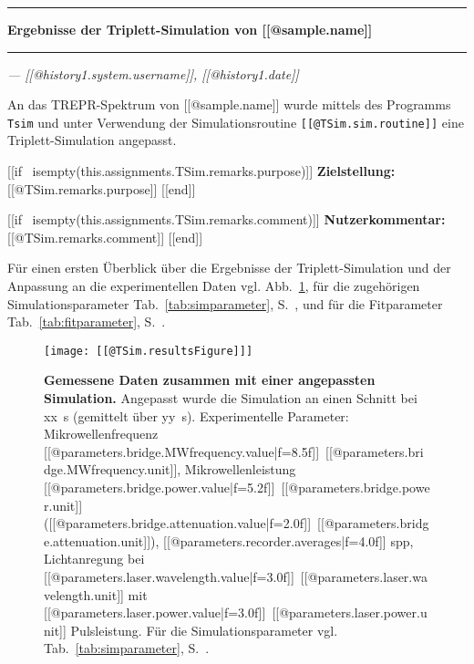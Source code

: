 \documentclass{article}
\begin{document}
\thispagestyle{empty}

\vspace*{-1.5cm}

\noindent\rule[1.5ex]{\textwidth}{1pt}

\begin{sffamily}\bfseries\large
Ergebnisse der Triplett-Simulation von [[@sample.name]]
\end{sffamily}

\noindent\rule{\textwidth}{1pt}

\begin{flushright}\slshape
--- [[@history{1}.system.username]], [[@history{1}.date]]
\end{flushright}

\vspace*{1.5em}

An das TREPR-Spektrum von [[@sample.name]] wurde mittels des Programms \texttt{Tsim} und unter Verwendung der Simulationsroutine \texttt{[[@TSim.sim.routine]]} eine Triplett-Simulation angepasst.

[[if ~isempty(this.assignments.TSim.remarks.purpose)]]
\textbf{Zielstellung:} [[@TSim.remarks.purpose]]
[[end]]

[[if ~isempty(this.assignments.TSim.remarks.comment)]]
\textbf{Nutzerkommentar:} [[@TSim.remarks.comment]]
[[end]]

Für einen ersten Überblick über die Ergebnisse der Triplett-Simulation und der Anpassung an die experimentellen Daten vgl. Abb.~\ref{fig:ergebnisse}, für die zugehörigen Simulationsparameter Tab.~\ref{tab:simparameter}, S.~\pageref{tab:simparameter}, und für die Fitparameter Tab.~\ref{tab:fitparameter}, S.~\pageref{tab:fitparameter}.


\begin{figure}[h]
\centering
\texttt{[image: [[@TSim.resultsFigure]]]}
\caption{\textbf{Gemessene Daten zusammen mit einer angepassten Simulation.} Angepasst wurde die Simulation an einen Schnitt bei xx~s (gemittelt über yy~s). Experimentelle Parameter: Mikrowellenfrequenz [[@parameters.bridge.MWfrequency.value|f=8.5f]]~[[@parameters.bridge.MWfrequency.unit]], Mikrowellenleistung [[@parameters.bridge.power.value|f=5.2f]]~[[@parameters.bridge.power.unit]] ([[@parameters.bridge.attenuation.value|f=2.0f]]~[[@parameters.bridge.attenuation.unit]]), [[@parameters.recorder.averages|f=4.0f]] spp, Lichtanregung bei [[@parameters.laser.wavelength.value|f=3.0f]]~[[@parameters.laser.wavelength.unit]] mit [[@parameters.laser.power.value|f=3.0f]]~[[@parameters.laser.power.unit]] Pulsleistung. Für die Simulationsparameter vgl. Tab.~\ref{tab:simparameter}, S.~\pageref{tab:simparameter}.}
\label{fig:ergebnisse}
\end{figure}
\end{document}
